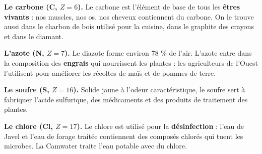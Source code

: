 \documentclass[11pt]{article}
\begin{document}
\textbf{Le carbone (C, $Z = 6$).} Le carbone est l'élément de base de tous les \textbf{êtres vivants} : nos muscles, nos os, nos cheveux contiennent du carbone. On le trouve aussi dans le charbon de bois utilisé pour la cuisine, dans le graphite des crayons et dans le diamant.

\textbf{L'azote (N, $Z = 7$).} Le diazote  forme environ 78 \% de l'air. L'azote entre dans la composition des \textbf{engrais} qui nourrissent les plantes : les agriculteurs de l'Ouest l'utilisent pour améliorer les récoltes de maïs et de pommes de terre.

\textbf{Le soufre (S, $Z = 16$).} Solide jaune à l'odeur caractéristique, le soufre sert à fabriquer l'acide sulfurique, des médicaments et des produits de traitement des plantes.

\textbf{Le chlore (Cl, $Z = 17$).} Le chlore est utilisé pour la \textbf{désinfection} : l'eau de Javel et l'eau de forage traitée contiennent des composés chlorés qui tuent les microbes. La Camwater traite l'eau potable avec du chlore.
\end{document}
